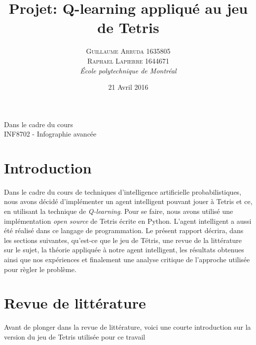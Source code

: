 \documentclass[a4paper, 12pt]{article} %
\title{Projet: Q-learning appliqué au jeu de Tetris}
\author{\textsc{Guillaume Arruda 1635805\\Raphael Lapierre 1644671} %
\vspace{10pt}
\\{\textit{École polytechnique de Montréal}}} %
\date{21 Avril 2016} %
\makeatletter
\renewcommand{\maketitle}{ %
\begin{center} %

\vspace*{25pt} %
{\LARGE\@title} %

\vspace{125pt} %

{\large\@author} %

\vspace{125pt} %
Dans le cadre du cours
\\INF8702 - Infographie avancée
\vspace{125pt} %
\\\@date %
\vspace{125pt} %

\end{center}
}
\makeatother
\begin{document}
\thispagestyle{empty}
\clearpage\maketitle %
\pagebreak[4]
\tableofcontents
\pagebreak[4]

\setlength{\headheight}{15.0pt}
\pagestyle{fancy}
\fancyhead[C]{}

\section{Introduction}
    \paragraph{}
    Dans le cadre du cours de techniques d'intelligence artificielle probabilistiques,
    nous avons décidé d'implémenter un agent intelligent pouvant jouer à Tetris et ce,
    en utilisant la technique de \textit{Q-learning}. Pour se faire, nous avons utilisé
    une implémentation \textit{open source} de Tetris écrite en Python. L'agent intelligent
    a aussi été réalisé dans ce langage de programmation. Le présent rapport décrira, dans les 
    sections suivantes, qu'est-ce que le jeu de Tétris, une revue de la littérature sur le sujet,
    la théorie appliquée à notre agent intelligent, les résultats obtenues ainsi que nos expériences
    et finalement une analyse critique de l'approche utilisée pour règler le problème.


\section{Revue de littérature}
    \paragraph{}
    Avant de plonger dans la revue de littérature, voici une courte introduction sur la version
    du jeu de Tetris utilisée pour ce travail
\end{document}
